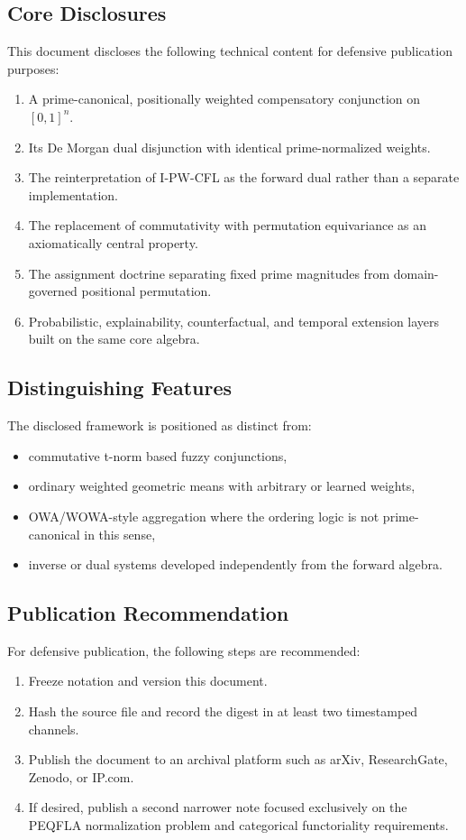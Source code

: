 \documentclass[11pt]{article}
\begin{document}
\subsection{Core Disclosures}
This document discloses the following technical content for defensive publication purposes:
\begin{enumerate}[label=\alph*.]
  \item A prime-canonical, positionally weighted compensatory conjunction on $[0,1]^n$.
  \item Its De Morgan dual disjunction with identical prime-normalized weights.
  \item The reinterpretation of I-PW-CFL as the forward dual rather than a separate implementation.
  \item The replacement of commutativity with permutation equivariance as an axiomatically central property.
  \item The assignment doctrine separating fixed prime magnitudes from domain-governed positional permutation.
  \item Probabilistic, explainability, counterfactual, and temporal extension layers built on the same core algebra.
\end{enumerate}

\subsection{Distinguishing Features}
The disclosed framework is positioned as distinct from:
\begin{itemize}
  \item commutative t-norm based fuzzy conjunctions,
  \item ordinary weighted geometric means with arbitrary or learned weights,
  \item OWA/WOWA-style aggregation where the ordering logic is not prime-canonical in this sense,
  \item inverse or dual systems developed independently from the forward algebra.
\end{itemize}

\subsection{Publication Recommendation}
For defensive publication, the following steps are recommended:
\begin{enumerate}[label=\arabic*.]
  \item Freeze notation and version this document.
  \item Hash the source file and record the digest in at least two timestamped channels.
  \item Publish the document to an archival platform such as arXiv, ResearchGate, Zenodo, or IP.com.
  \item If desired, publish a second narrower note focused exclusively on the PEQFLA normalization problem and categorical functoriality requirements.
\end{enumerate}
\end{document}
